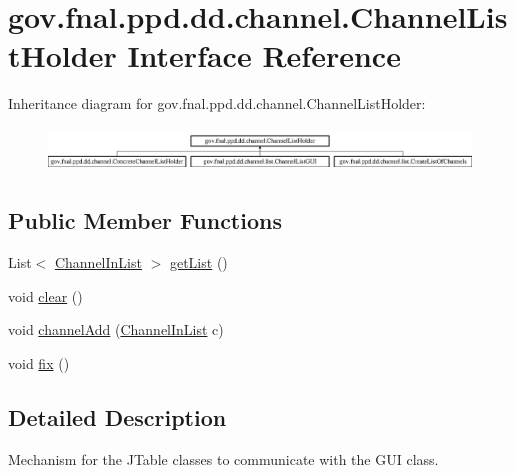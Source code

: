 \hypertarget{interfacegov_1_1fnal_1_1ppd_1_1dd_1_1channel_1_1ChannelListHolder}{\section{gov.\-fnal.\-ppd.\-dd.\-channel.\-Channel\-List\-Holder Interface Reference}
\label{interfacegov_1_1fnal_1_1ppd_1_1dd_1_1channel_1_1ChannelListHolder}
}
Inheritance diagram for gov.\-fnal.\-ppd.\-dd.\-channel.\-Channel\-List\-Holder\-:\begin{figure}[H]
\begin{center}
\leavevmode
\includegraphics[height=1.174004cm]{interfacegov_1_1fnal_1_1ppd_1_1dd_1_1channel_1_1ChannelListHolder}
\end{center}
\end{figure}
\subsection*{Public Member Functions}
\begin{DoxyCompactItemize}
\item 
List$<$ \hyperlink{classgov_1_1fnal_1_1ppd_1_1dd_1_1channel_1_1ChannelInList}{Channel\-In\-List} $>$ \hyperlink{interfacegov_1_1fnal_1_1ppd_1_1dd_1_1channel_1_1ChannelListHolder_a964a6a5e52085e0c24f855f71428d5c3}{get\-List} ()
\item 
void \hyperlink{interfacegov_1_1fnal_1_1ppd_1_1dd_1_1channel_1_1ChannelListHolder_ac8fd01c353de039cc05d830b971e87b1}{clear} ()
\item 
void \hyperlink{interfacegov_1_1fnal_1_1ppd_1_1dd_1_1channel_1_1ChannelListHolder_a8541dd9579b0387798a620920cefb18e}{channel\-Add} (\hyperlink{classgov_1_1fnal_1_1ppd_1_1dd_1_1channel_1_1ChannelInList}{Channel\-In\-List} c)
\item 
void \hyperlink{interfacegov_1_1fnal_1_1ppd_1_1dd_1_1channel_1_1ChannelListHolder_a6d75a17b8c7a601e8f23dce56386fbc3}{fix} ()
\end{DoxyCompactItemize}


\subsection{Detailed Description}
Mechanism for the J\-Table classes to communicate with the G\-U\-I class.

